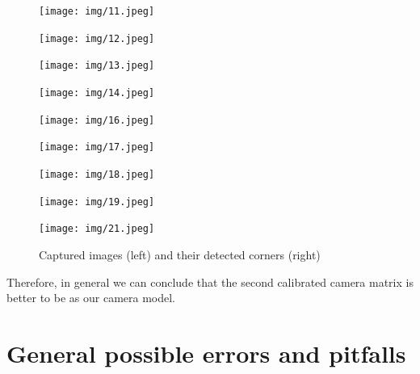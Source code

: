 \documentclass{scrartcl}
\begin{document}
\begin{figure}[H]
\centering
\begin{minipage}{.5\textwidth}
  \centering
  \texttt{[image: img/11.jpeg]}
\end{minipage}
\begin{minipage}{.5\textwidth}
  \centering
  \texttt{[image: img/12.jpeg]}
\end{minipage}
\begin{minipage}{.5\textwidth}
  \centering
  \texttt{[image: img/13.jpeg]}
\end{minipage}
\begin{minipage}{.5\textwidth}
  \centering
  \texttt{[image: img/14.jpeg]}
\end{minipage}
\begin{minipage}{.5\textwidth}
  \centering
  \texttt{[image: img/16.jpeg]}
\end{minipage}
\begin{minipage}{.5\textwidth}
  \centering
  \texttt{[image: img/17.jpeg]}
\end{minipage}
\begin{minipage}{.5\textwidth}
  \centering
  \texttt{[image: img/18.jpeg]}
\end{minipage}
\begin{minipage}{.5\textwidth}
  \centering
  \texttt{[image: img/19.jpeg]}
\end{minipage}
\begin{minipage}{.5\textwidth}
  \centering
  \texttt{[image: img/21.jpeg]}
\end{minipage}

\caption{Captured images (left) and their detected corners (right)}
\end{figure}


Therefore, in general we can conclude that the second calibrated camera matrix is better to be as our camera model.\\

\section{General possible errors and pitfalls}
\end{document}
